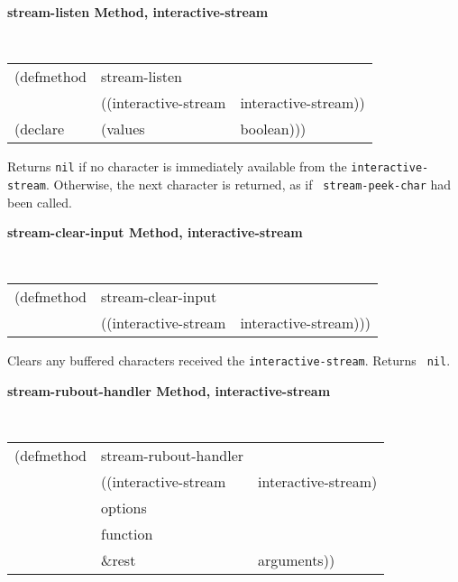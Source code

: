 \documentclass[twoside]{book}
\begin{document}
\begin{sloppy}
\begin{flushright}
{}\end{flushright}



{\samepage
{\large {\bf stream-listen \hfill Method, interactive-stream}}
\begin{flushright} \parbox[t]{6.125in}{
\tt
\begin{tabular}{lll}
\raggedright
(defmethod & stream-listen & \\
& ((interactive-stream  &interactive-stream))\\
(declare &(values &boolean)))
\end{tabular}
\rm

}\end{flushright}}

\begin{flushright} \parbox[t]{6.125in}{
Returns {\tt nil} if no character is immediately available from the
{\tt interactive-stream}. Otherwise, the next character is returned, as if {\tt
stream-peek-char} had been called.}

\end{flushright}

{\samepage
{\large {\bf stream-clear-input \hfill Method, interactive-stream}}
\begin{flushright} \parbox[t]{6.125in}{
\tt
\begin{tabular}{lll}
\raggedright
(defmethod & stream-clear-input & \\
& ((interactive-stream  &interactive-stream)))
\end{tabular}
\rm

}\end{flushright}}

\begin{flushright} \parbox[t]{6.125in}{
Clears any buffered characters received the {\tt interactive-stream}. Returns {\tt
nil}.
 
}
\end{flushright}

{\samepage
{\large {\bf stream-rubout-handler \hfill Method, interactive-stream}}
\begin{flushright} \parbox[t]{6.125in}{
\tt
\begin{tabular}{lll}
\raggedright
(defmethod & stream-rubout-handler & \\
& ((interactive-stream  &interactive-stream)\\
& options\\
& function\\
&\&rest & arguments))
\end{tabular}
\rm

}
\end{flushright}}
\end{sloppy}
\end{document}
